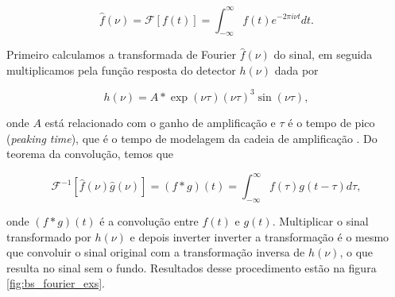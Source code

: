 \documentclass[a4paper,12pt,oneside]{book}
\DeclareMathOperator{\sinc}{sinc}
\DeclareMathOperator{\rect}{rect}
\begin{document}
\begin{equation} \label{eq:fourier}
    \hat{f}(\nu)=\mathscr{F}[f(t)]=\int_{-\infty}^{\infty} f(t) e^{-2 \pi i \nu t} d t.
\end{equation}

\par Primeiro calculamos a transformada de Fourier $\hat{f}(\nu)$ do sinal, em seguida multiplicamos pela função resposta do detector $h(\nu)$ dada por\cite{GET}

\begin{equation}
    h(\nu) = A*\exp\left (\nu \tau \right)\left(\nu \tau\right)^3 \sin \left( \nu \tau \right) ,
\end{equation}


\par onde $A$ está relacionado com o ganho de amplificação e $\tau$ é o tempo de pico (\textit{peaking time}), que é o tempo de modelagem da cadeia de amplificação \cite{GET}. Do teorema da convolução, temos que \cite{metodos_mat_aplicada}


\begin{equation}
    \mathscr{F}^{-1}[\hat{f}(\nu) \hat{g}(\nu)]=(f * g)(t)=\int_{-\infty}^{\infty} f(\tau) g(t-\tau) d \tau, 
\end{equation}

\par onde $(f * g)(t)$ é a convolução entre $f(t)$ e $g(t)$. Multiplicar o sinal transformado por $h(\nu)$ e depois inverter inverter a transformação é o mesmo que convoluir o sinal original com a transformação inversa de $h(\nu)$, o que resulta no sinal sem o fundo\cite{josh_bradt, GET}. Resultados desse procedimento estão na figura \ref{fig:bs_fourier_exs}.


%
\end{document}
